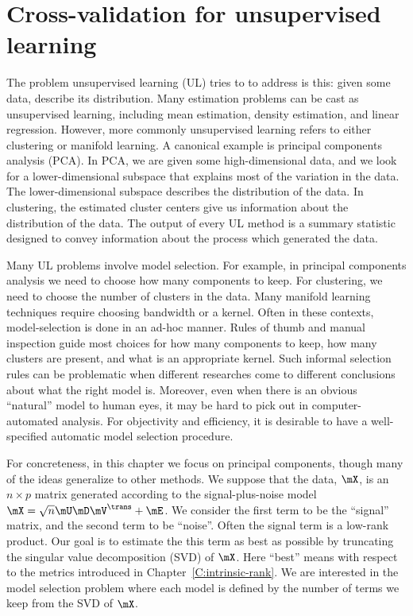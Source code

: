 
\chapter{Cross-validation for unsupervised learning}

The problem unsupervised learning (UL) tries to to address is this: given some
data, describe its distribution. Many estimation problems can be cast as
unsupervised learning, including mean estimation, density estimation, and
linear regression. However, more commonly unsupervised learning refers to
either clustering or manifold learning. A canonical example is principal
components analysis (PCA). In PCA, we are given some high-dimensional data,
and we look for a lower-dimensional subspace that explains most of the
variation in the data. The lower-dimensional subspace describes the
distribution of the data. In clustering, the estimated cluster centers give us
information about the distribution of the data. The output of every UL method
is a summary statistic designed to convey information about the process which
generated the data.

Many UL problems involve model selection. For example, in principal components
analysis we need to choose how many components to keep. For clustering, we
need to choose the number of clusters in the data. Many manifold learning
techniques require choosing bandwidth or a kernel. Often in these contexts,
model-selection is done in an ad-hoc manner. Rules of thumb and manual
inspection guide most choices for how many components to keep, how many
clusters are present, and what is an appropriate kernel. Such informal
selection rules can be problematic when different researches come to different
conclusions about what the right model is. Moreover, even when there is an
obvious ``natural'' model to human eyes, it may be hard to pick out in
computer-automated analysis. For objectivity and efficiency, it is desirable to have a well-specified automatic model selection procedure.

For concreteness, in this chapter we focus on principal components, though
many of the ideas generalize to other methods. We suppose that the data,
$\mX$, is an $n \times p$ matrix generated according to the signal-plus-noise
model $\mX = \sqrt{n} \mU \mD \mV^\trans + \mE$. We consider the first term to
be the ``signal'' matrix, and the second term to be ``noise''. Often the
signal term is a low-rank product. Our goal is to estimate the this term as
best as possible by truncating the singular value decomposition (SVD) of
$\mX$. Here ``best'' means with respect to the metrics introduced in
Chapter~\ref{C:intrinsic-rank}. We are interested in the model selection
problem where each model is defined by the number of terms we keep from the
SVD of $\mX$.

